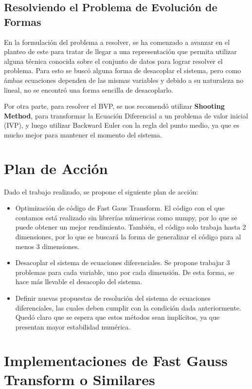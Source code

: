 \documentclass[letter, 10pt]{article}
\begin{document}
\subsection{Resolviendo el Problema de Evolución de Formas}
En la formulación del problema a resolver, se ha comenzado a avanzar en el planteo de este para tratar de llegar a una representación que permita utilizar alguna técnica conocida sobre el conjunto de datos para lograr resolver el problema. Para esto se buscó alguna forma de desacoplar el sistema, pero como ámbas ecuaciones dependen de las mismas variables y debido a su naturaleza no lineal, no se encontró una forma sencilla de desacoplarlo.

Por otra parte, para resolver el BVP, se nos recomendó utilizar \textbf{Shooting Method}, para transformar la Ecuación Diferencial a un problema de valor inicial (IVP), y luego utilizar Backward Euler con la regla del punto medio, ya que es mucho mejor para mantener el momento del sistema.

\section{Plan de Acción}

Dado el trabajo realizado, se propone el siguiente plan de acción:

\begin{itemize}
\item Optimización de código de Fast Gaus Transform. El código con el que contamos está realizado sin librerías númericas como numpy, por lo que se puede obtener un mejor rendimiento. También, el código solo trabaja hasta 2 dimensiones, por lo que se buscará la forma de generalizar el código para al menos 3 dimensiones.
\item Desacoplar el sistema de ecuaciones diferenciales. Se propone trabajar 3 problemas para cada variable, uno por cada dimensión. De esta forma, se hace más llevable el desacoplo del sistema.
\item Definir nuevas propuestas de resolución del sistema de ecuaciones diferenciales, las cuales deben cumplir con la condición dada anteriormente. Quedó claro que se espera que estos métodos sean implícitos, ya que presentan mayor estabilidad numérica.
\end{itemize}


\section{Implementaciones de Fast Gauss Transform o Similares}
\end{document}
